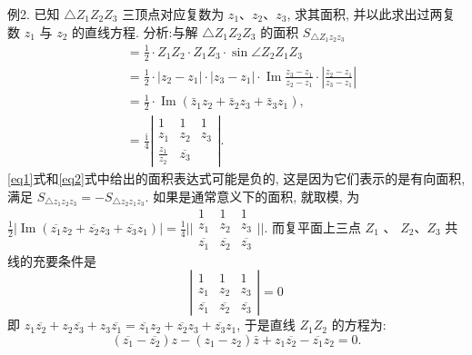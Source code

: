 例2. 已知 $\triangle Z_1 Z_2 Z_3$ 三顶点对应复数为 $z_1 、 z_2 、 z_3$, 求其面积, 并以此求出过两复数 $z_1$ 与 $z_2$ 的直线方程.
分析:与解 $\triangle Z_1 Z_2 Z_3$ 的面积 $S_{\triangle Z_1 z_2 z_3}$
$$
\begin{aligned}
& =\frac{1}{2} \cdot Z_1 Z_2 \cdot Z_1 Z_3 \cdot \sin \angle Z_2 Z_1 Z_3 \\
& =\frac{1}{2} \cdot\left|z_2-z_1\right| \cdot\left|z_3-z_1\right| \cdot \operatorname{Im} \frac{z_3-z_1}{z_2-z_1} \cdot\left|\frac{z_2-z_1}{z_3-z_1}\right| \\
& =\frac{1}{2} \cdot \operatorname{Im}\left(\bar{z}_1 z_2+\bar{z}_2 z_3+\bar{z}_3 z_1\right),\label{eq1} \\
& =\frac{\mathrm{i}}{4}\left|\begin{array}{ccc}
1 & 1 & 1 \\
z_1 & z_2 & z_3 \\
\frac{z_1}{z_2} & \overline{z_3}
\end{array}\right| . \label{eq2}
\end{aligned}
$$
\ref{eq1}式和\ref{eq2}式中给出的面积表达式可能是负的, 这是因为它们表示的是有向面积, 满足 $S_{\triangle z_1 z_2 z_3}=-S_{\triangle z_2 z_1 z_3}$. 如果是通常意义下的面积, 就取模, 为
$\frac{1}{2}\left|\operatorname{Im}\left(\overline{z_1} z_2+\overline{z_2} z_3+\overline{z_3} z_1\right)\right|=\frac{1}{4}|| \begin{array}{ccc}1 & 1 & 1 \\ z_1 & z_2 & z_3 \\ \overline{z_1} & \overline{z_2} & \overline{z_3}\end{array}||$. 而复平面上三点 $Z_1$ 、 $Z_2 、 Z_3$ 共线的充要条件是
$$
\left|\begin{array}{ccc}
1 & 1 & 1 \\
z_1 & z_2 & z_3 \\
\overline{z_1} & \overline{z_2} & \overline{z_3}
\end{array}\right|=0
$$
即 $z_1 \overline{z_2}+z_2 \overline{z_3}+z_3 \overline{z_1}=\overline{z_1} z_2+\overline{z_2} z_3+\overline{z_3} z_1$, 于是直线 $Z_1 Z_2$ 的方程为:
$$
\left(\overline{z_1}-\overline{z_2}\right) z-\left(z_1-z_2\right) \bar{z}+z_1 \overline{z_2}-\overline{z_1} z_2=0 .
$$



